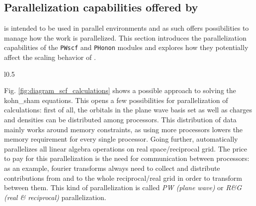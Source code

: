 \documentclass[main.tex]{subfiles}
\begin{document}
\subsection{Parallelization capabilities offered by \QE}\label{sub:qe_parallelization}

\QE is intended to be used in parallel environments and as such offers possibilities to manage how the work is parallelized.
This section introduces the parallelization capabilities of the \texttt{PWscf} and \texttt{PHonon} modules and explores how they potentially affect the scaling behavior of \QE.

\begin{wrapfigure}{l}{0.5\textwidth}
\centering
{}
\label{fig:diagram_scf_calculations}
\caption{Flowchart of an algorithm to solve the \acrshort{kohn_sham} equations}
\end{wrapfigure}

Fig. \ref{fig:diagram_scf_calculations} shows a possible approach to solving the \acrshort{kohn_sham} equations.
This opens a few possibilities for parallelization of calculations: first of all, the orbitals in the plane wave basis set as well as charges and densities can be distributed among processors.
This distribution of data mainly works around memory constraints, as using more processors lowers the memory requirement for every single processor.
Going further, \QE automatically parallelizes all linear algebra operations on real space/reciprocal grid.
The price to pay for this parallelization is the need for communication between processors: as an example, fourier transforms always need to collect and distribute contributions from and to the whole reciprocal/real grid in order to transform between them.
This kind of parallelization is called \emph{PW (plane wave)} or \emph{R\&G (real \& reciprocal)} parallelization. 
\end{document}
